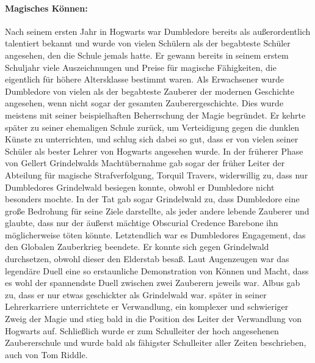 \documentclass[a4paper, 10pt]{article}
\begin{document}
\paragraph{Magisches Können:}
Nach seinem ersten Jahr in Hogwarts war Dumbledore bereits als außerordentlich talentiert bekannt und wurde von vielen Schülern als der begabteste Schüler angesehen, den die Schule jemals hatte. Er gewann bereits in seinem erstem Schuljahr viele Auszeichnungen und Preise für magische Fähigkeiten, die eigentlich für höhere Altersklasse bestimmt waren. Als Erwachsener wurde Dumbledore von vielen als der begabteste Zauberer der modernen Geschichte angesehen, wenn nicht sogar der gesamten Zauberergeschichte. Dies wurde meistens mit seiner beispielhaften Beherrschung der Magie begründet. Er kehrte später zu seiner ehemaligen Schule zurück, um Verteidigung gegen die dunklen Künste zu unterrichten, und schlug sich dabei so gut, dass er von vielen seiner Schüler als bester Lehrer von Hogwarts angesehen wurde. In der früherer Phase von Gellert Grindelwalds Machtübernahme gab sogar der früher Leiter der Abteilung für magische Strafverfolgung, Torquil Travers, widerwillig zu, dass nur Dumbledores Grindelwald besiegen konnte, obwohl er Dumbledore nicht besonders mochte. In der Tat gab sogar Grindelwald zu, dass Dumbledore eine große Bedrohung für seine Ziele darstellte, als jeder andere lebende Zauberer und glaubte, dass nur der äußerst mächtige Obscurial Credence Barebone ihn möglicherweise töten könnte. Letztendlich war es Dumbledores Engagement, das den Globalen Zauberkrieg beendete. Er konnte sich gegen Grindelwald durchsetzen, obwohl dieser den Elderstab besaß. Laut Augenzeugen war das legendäre Duell eine so erstaunliche Demonstration von Können und Macht, dass es wohl der spannendste Duell zwischen zwei Zauberern jeweils war. Albus gab zu, dass er nur etwas geschickter als Grindelwald war. später in seiner Lehrerkarriere unterrichtete er Verwandlung, ein komplexer und schwieriger Zweig der Magie und stieg bald in die Position des Leiter der Verwandlung von Hogwarts auf. Schließlich wurde er zum Schulleiter der hoch angesehenen Zaubererschule und wurde bald als fähigster Schulleiter aller Zeiten beschrieben, auch von Tom Riddle.
\end{document}
